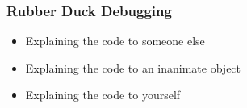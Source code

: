 \documentclass[serif, 9pt, aspectratio=32]{beamer}
\begin{document}
\begin{frame}
    \centering
    \frametitle{Rubber Duck Debugging}
    \begin{itemize}
        \setlength{\itemsep}{3em}
        \item Explaining the code to someone else
        \item Explaining the code to an inanimate object
        \item Explaining the code to yourself
    \end{itemize}
\end{frame}
\end{document}
